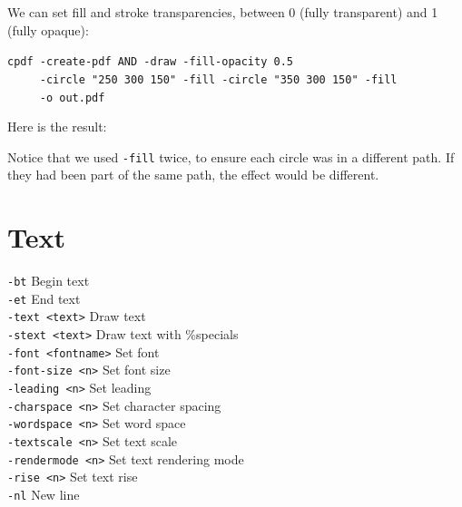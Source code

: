 \documentclass{book}
\begin{document}
We can set fill and stroke transparencies, between 0 (fully transparent) and 1 (fully opaque):

\begin{framed}
 \noindent\small\verb?cpdf -create-pdf AND -draw -fill-opacity 0.5?\\
 \noindent\small\verb?     -circle "250 300 150" -fill -circle "350 300 150" -fill?\\
 \noindent\small\verb?     -o out.pdf?
\end{framed}

\noindent Here is the result:

\bigskip
{}
\bigskip

\noindent Notice that we used \texttt{-fill} twice, to ensure each circle was in a different path. If they had been part of the same path, the effect would be different.


\section{Text}

  {\small\begin{framed}
   \noindent\verb!-bt! Begin text\\
   \noindent\verb!-et! End text\\
   \noindent\verb!-text <text>! Draw text\\
   \noindent\verb!-stext <text>! Draw text with \%specials\\
   \noindent\verb!-font <fontname>! Set font\\
   \noindent\verb!-font-size <n>! Set font size\\
   \noindent\verb!-leading <n>! Set leading\\
   \noindent\verb!-charspace <n>! Set character spacing\\
   \noindent\verb!-wordspace <n>! Set word space\\
   \noindent\verb!-textscale <n>! Set text scale\\
   \noindent\verb!-rendermode <n>! Set text rendering mode\\
   \noindent\verb!-rise <n>! Set text rise\\
   \noindent\verb!-nl! New line\end{framed}}
\end{document}
